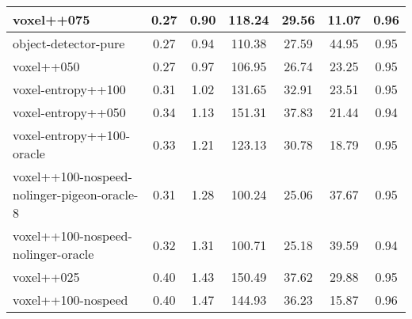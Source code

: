 \begin{sidewaystable}
\begin{longtable}{|l|c|c|c|c|c|c|}
voxel++075 & {\cellcolor[HTML]{99CBC0}} \color[HTML]{000000} 0.27 & {\cellcolor[HTML]{ADD4CC}} \color[HTML]{000000} 0.90 & {\cellcolor[HTML]{85C1B5}} \color[HTML]{000000} 118.24 & 29.56 & 11.07 & 0.96 \\ \hline
object-detector-pure & {\cellcolor[HTML]{99CBC0}} \color[HTML]{000000} 0.27 & {\cellcolor[HTML]{AAD3CA}} \color[HTML]{000000} 0.94 & {\cellcolor[HTML]{8FC6BB}} \color[HTML]{000000} 110.38 & 27.59 & 44.95 & 0.95 \\ \hline
voxel++050 & {\cellcolor[HTML]{98CAC0}} \color[HTML]{000000} 0.27 & {\cellcolor[HTML]{A7D2C9}} \color[HTML]{000000} 0.97 & {\cellcolor[HTML]{93C8BD}} \color[HTML]{000000} 106.95 & 26.74 & 23.25 & 0.95 \\ \hline
voxel-entropy++100 & {\cellcolor[HTML]{8EC5BA}} \color[HTML]{000000} 0.31 & {\cellcolor[HTML]{A3D0C7}} \color[HTML]{000000} 1.02 & {\cellcolor[HTML]{75B9AB}} \color[HTML]{000000} 131.65 & 32.91 & 23.51 & 0.95 \\ \hline
voxel-entropy++050 & {\cellcolor[HTML]{81BFB3}} \color[HTML]{000000} 0.34 & {\cellcolor[HTML]{9CCCC2}} \color[HTML]{000000} 1.13 & {\cellcolor[HTML]{5DAE9E}} \color[HTML]{F1F1F1} 151.31 & 37.83 & 21.44 & 0.94 \\ \hline
voxel-entropy++100-oracle & {\cellcolor[HTML]{85C1B5}} \color[HTML]{000000} 0.33 & {\cellcolor[HTML]{95C9BE}} \color[HTML]{000000} 1.21 & {\cellcolor[HTML]{7FBEB2}} \color[HTML]{000000} 123.13 & 30.78 & 18.79 & 0.95 \\ \hline
voxel++100-nospeed-nolinger-pigeon-oracle-8 & {\cellcolor[HTML]{8CC5B9}} \color[HTML]{000000} 0.31 & {\cellcolor[HTML]{90C7BC}} \color[HTML]{000000} 1.28 & {\cellcolor[HTML]{9BCCC2}} \color[HTML]{000000} 100.24 & 25.06 & 37.67 & 0.95 \\ \hline
voxel++100-nospeed-nolinger-oracle & {\cellcolor[HTML]{8BC4B8}} \color[HTML]{000000} 0.32 & {\cellcolor[HTML]{8EC5BA}} \color[HTML]{000000} 1.31 & {\cellcolor[HTML]{9ACBC1}} \color[HTML]{000000} 100.71 & 25.18 & 39.59 & 0.94 \\ \hline
voxel++025 & {\cellcolor[HTML]{71B7A9}} \color[HTML]{F1F1F1} 0.40 & {\cellcolor[HTML]{86C2B5}} \color[HTML]{000000} 1.43 & {\cellcolor[HTML]{5EAF9E}} \color[HTML]{F1F1F1} 150.49 & 37.62 & 29.88 & 0.95 \\ \hline
voxel++100-nospeed & {\cellcolor[HTML]{70B7A9}} \color[HTML]{F1F1F1} 0.40 & {\cellcolor[HTML]{82C0B3}} \color[HTML]{000000} 1.47 & {\cellcolor[HTML]{65B2A2}} \color[HTML]{F1F1F1} 144.93 & 36.23 & 15.87 & 0.96 \\ \hline

\end{longtable}
\end{sidewaystable}
